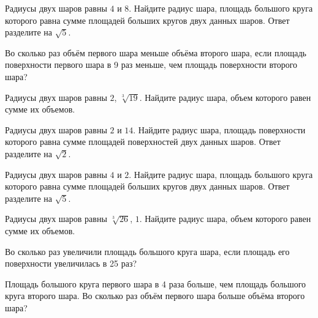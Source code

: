 \documentclass[a4paper]{article}
\begin{document}
\begin{taskBN}{49}
Радиусы двух шаров равны $4$ и $8$. Найдите радиус шара, площадь большого круга которого равна сумме площадей больших кругов двух данных шаров. Ответ разделите на $\sqrt{5}$.
\end{taskBN}

\begin{taskBN}{50}
Во сколько раз объём первого шара меньше объёма второго шара, если площадь поверхности первого шара в 9 раз меньше, чем площадь поверхности второго шара?
\end{taskBN}

\begin{taskBN}{51}
Радиусы двух шаров равны $2$, $\sqrt[3]{19}$. Найдите радиус шара, объем которого равен сумме их объемов.
\end{taskBN}

\begin{taskBN}{52}
Радиусы двух шаров равны $2$ и $14$. Найдите радиус шара, площадь поверхности которого равна сумме площадей поверхностей двух данных шаров. Ответ разделите на $\sqrt{2}$.
\end{taskBN}

\begin{taskBN}{53}
Радиусы двух шаров равны $4$ и $2$. Найдите радиус шара, площадь большого круга которого равна сумме площадей больших кругов двух данных шаров. Ответ разделите на $\sqrt{5}$.
\end{taskBN}

\begin{taskBN}{54}
Радиусы двух шаров равны $\sqrt[3]{26}$, $1$. Найдите радиус шара, объем которого равен сумме их объемов.
\end{taskBN}

\begin{taskBN}{55}
Во сколько раз увеличили площадь большого круга шара, если площадь его поверхности увеличилась в 25 раз?
\end{taskBN}

\begin{taskBN}{56}
Площадь большого круга первого шара в 4 раза больше, чем площадь большого круга второго шара. Во сколько раз объём первого шара больше объёма второго шара?
\end{taskBN}
\end{document}
